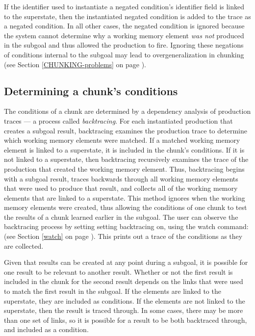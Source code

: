 If the identifier used to instantiate a negated condition's identifier field
is linked to the superstate, then the instantiated negated condition is
added to the trace as a negated condition. In all other cases, the negated
condition is ignored because the system cannot determine why a working memory
element \emph{was not} produced in the subgoal and thus allowed the production
to fire. Ignoring these negations of conditions internal to the subgoal may
lead to overgeneralization in chunking (see Section \ref{CHUNKING-problems} on
page \pageref{CHUNKING-problems}). 
     
\subsection{Determining a chunk's conditions}

The conditions of a chunk are determined by a dependency analysis of
production traces --- a process called \emph{backtracing}.  For each
instantiated production that creates a subgoal result, backtracing examines
the production trace to determine which working memory elements were matched.
If a matched working memory element is linked to a superstate, it is included
in the chunk's conditions. If it is not linked to a superstate, then
backtracing recursively examines the trace of the production that created the
working memory element. Thus, backtracing begins with a subgoal result, traces
backwards through all working memory elements that were used to produce that
result, and collects all of the working memory elements that are linked to a
superstate. This method ignores when the working memory elements were created,
thus allowing the conditions of one chunk to test the results of a chunk
learned earlier in the subgoal. The user can observe the backtracing process
by setting setting backtracing on, using the watch command:  (see Section \ref{watch} on page \pageref{watch}). 
This prints out a trace of the conditions as they are collected.

Given that results can be created at any point during a subgoal, it is
possible for one result to be relevant to another result. Whether or not the 
first result is included in the chunk for the second result depends on the
links that were used to match the first result in the subgoal. If the elements
are linked to the superstate, they are included as conditions. If the
elements are not linked to the superstate, then the result is traced through.
In some cases, there may be more than one set of links, so it is possible for
a result to be both backtraced through, and included as a condition.

